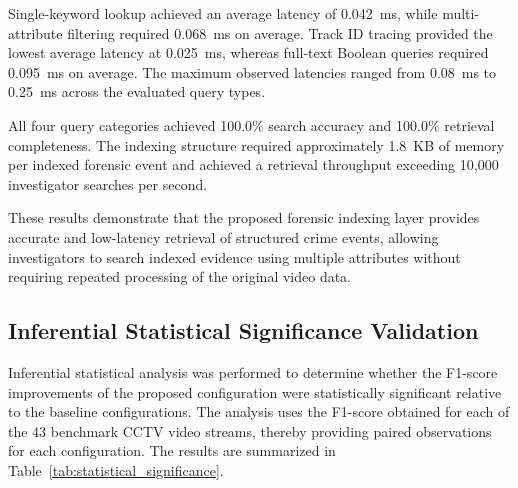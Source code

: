 \documentclass[runningheads]{llncs}
\begin{document}
Single-keyword lookup achieved an average latency of 0.042~ms, while
multi-attribute filtering required 0.068~ms on average. Track ID tracing
provided the lowest average latency at 0.025~ms, whereas full-text
Boolean queries required 0.095~ms on average. The maximum observed
latencies ranged from 0.08~ms to 0.25~ms across the evaluated query
types.

All four query categories achieved 100.0\% search accuracy and 100.0\%
retrieval completeness. The indexing structure required approximately
1.8~KB of memory per indexed forensic event and achieved a retrieval
throughput exceeding 10,000 investigator searches per second.

These results demonstrate that the proposed forensic indexing layer
provides accurate and low-latency retrieval of structured crime events,
allowing investigators to search indexed evidence using multiple
attributes without requiring repeated processing of the original video
data.

\begin{table}[htbp]
\centering
\caption{Forensic indexing and investigator retrieval performance.}
\label{tab:retrieval_performance}
\end{table}

\subsection{Inferential Statistical Significance Validation}

Inferential statistical analysis was performed to determine whether the
F1-score improvements of the proposed configuration were statistically
significant relative to the baseline configurations. The analysis uses
the F1-score obtained for each of the 43 benchmark CCTV video streams,
thereby providing paired observations for each configuration. The results
are summarized in Table~\ref{tab:statistical_significance}.
\end{document}
